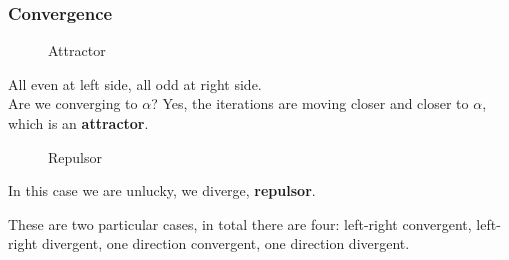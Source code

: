 \pagebreak
\subsubsection{Convergence}
\begin{figure}[!ht]
    \begin{minipage}{\linewidth}
        \centering
        \caption{Attractor}
    \end{minipage}
\end{figure}

All even at left side, all odd at right side.\\
Are we converging to $\alpha$? Yes, the iterations are moving closer and closer to $\alpha$, which is an \textbf{attractor}.

\begin{figure}[!ht]
    \begin{minipage}{\linewidth}
        \centering
        \caption{Repulsor}
    \end{minipage}
\end{figure}

In this case we are unlucky, we diverge, \textbf{repulsor}.

These are two particular cases, in total there are four: left-right convergent, left-right divergent, one direction convergent, one direction divergent.

